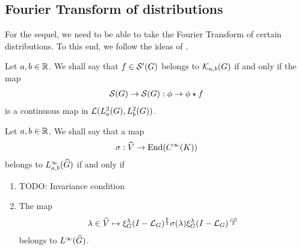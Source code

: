 \subsection{Fourier Transform of distributions}

For the sequel, we need to be able to take the Fourier Transform of certain distributions.
To this end, we follow the ideas of \cite{FischerRuzhansky15}.

\begin{definition}
    Let $a, b \in \R$.
    We shall say that $f \in \TemperedDistributions\Group$ belongs to $\KernelsSobolev{a}{b}$ if and only if the map
    \begin{align*}
        \Schwartz\Group \to \Schwartz\Group : \phi \to \conv{\phi}{f}
    \end{align*}
    is a continuous map in $\Lin{\Sobolev{a}, \Sobolev{b}}$.
\end{definition}

\begin{definition}
    Let $a, b \in \R$.
    We shall say that a map
    \begin{align*}
        \sigma : \dualGroup\VectorSpace \to \End(\SmoothFunctions{\CompactGroup})
    \end{align*}
    belongs to $\LebesgueDual[a, b]{\infty}{\Group}$ if and only if
    \begin{enumerate}
        \item TODO: Invariance condition
        \item The map
            \begin{align*}
                \lambda \in \dualGroup\VectorSpace \mapsto
                \Rep\lambda \BesselPotential{b} \sigma(\lambda) \Rep\lambda \BesselPotential{-a}
            \end{align*}
            belongs to $\LebesgueDual{\infty}{\Group}$.
    \end{enumerate}
\end{definition}

